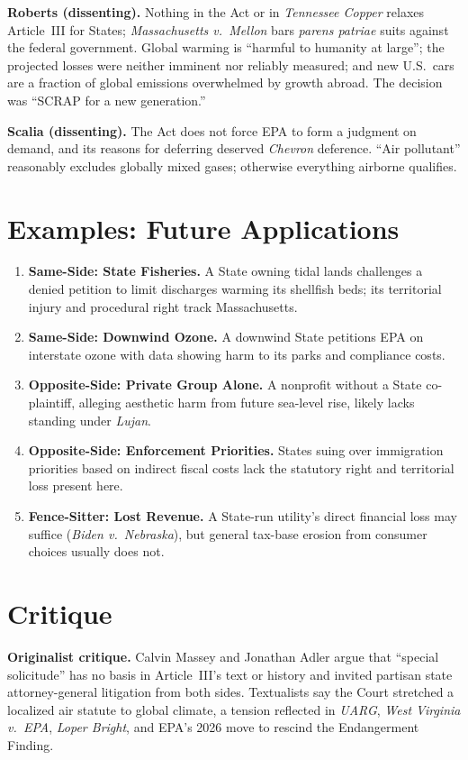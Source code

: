 \documentclass[12pt]{article}
\begin{document}
\textbf{Roberts (dissenting).} Nothing in the Act or in \textit{Tennessee Copper} relaxes Article~III for States; \textit{Massachusetts v.\ Mellon} bars \textit{parens patriae} suits against the federal government. Global warming is ``harmful to humanity at large''; the projected losses were neither imminent nor reliably measured; and new U.S.\ cars are a fraction of global emissions overwhelmed by growth abroad. The decision was ``SCRAP for a new generation.''

\textbf{Scalia (dissenting).} The Act does not force EPA to form a judgment on demand, and its reasons for deferring deserved \textit{Chevron} deference. ``Air pollutant'' reasonably excludes globally mixed gases; otherwise everything airborne qualifies.

\section{Examples: Future Applications}

\begin{enumerate}
\item \textbf{Same-Side: State Fisheries.} A State owning tidal lands challenges a denied petition to limit discharges warming its shellfish beds; its territorial injury and procedural right track Massachusetts.
\item \textbf{Same-Side: Downwind Ozone.} A downwind State petitions EPA on interstate ozone with data showing harm to its parks and compliance costs.
\item \textbf{Opposite-Side: Private Group Alone.} A nonprofit without a State co-plaintiff, alleging aesthetic harm from future sea-level rise, likely lacks standing under \textit{Lujan}.
\item \textbf{Opposite-Side: Enforcement Priorities.} States suing over immigration priorities based on indirect fiscal costs lack the statutory right and territorial loss present here.
\item \textbf{Fence-Sitter: Lost Revenue.} A State-run utility's direct financial loss may suffice (\textit{Biden v.\ Nebraska}), but general tax-base erosion from consumer choices usually does not.
\end{enumerate}

\section{Critique}

\textbf{Originalist critique.} Calvin Massey and Jonathan Adler argue that ``special solicitude'' has no basis in Article~III's text or history and invited partisan state attorney-general litigation from both sides. Textualists say the Court stretched a localized air statute to global climate, a tension reflected in \textit{UARG}, \textit{West Virginia v.\ EPA}, \textit{Loper Bright}, and EPA's 2026 move to rescind the Endangerment Finding.
\end{document}
